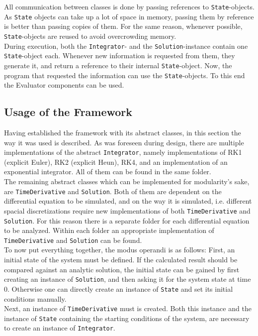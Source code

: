 All communication between classes is done by passing references to \texttt{State}-objects.
As \texttt{State} objects can take up a lot of space in memory, passing them by reference is better than passing copies of them.
For the same reason, whenever possible, \texttt{State}-objects are reused to avoid overcrowding memory.
\\
During execution, both the \texttt{Integrator}- and the \texttt{Solution}-instance contain one \texttt{State}-object each.
Whenever new information is requested from them, they generate it, and return a reference to their internal \texttt{State}-object.
Now, the program that requested the information can use the \texttt{State}-objects.
To this end the Evaluator components can be used.

\subsection{Usage of the Framework}
Having established the framework with its abstract classes, in this section the way it was used is described.
As was foreseen during design, there are multiple implementations of the abstract \texttt{Integrator}, namely implementations of RK1 (explicit Euler), RK2 (explicit Heun), RK4, and an implementation of an exponential integrator.
All of them can be found in the same folder.
\\
The remaining abstract classes which can be implemented for modularity's sake, are \texttt{TimeDerivative} and \texttt{Solution}.
Both of them are dependent on the differential equation to be simulated, and on the way it is simulated, i.e. different spacial discretizations require new implementations of both \texttt{TimeDerivative} and \texttt{Solution}.
For this reason there is a separate folder for each differential equation to be analyzed.
Within each folder an appropriate implementation of \texttt{TimeDerivative} and \texttt{Solution} can be found.
\\
To now put everything together, the modus operandi is as follows:
First, an initial state of the system must be defined.
If the calculated result should be compared against an analytic solution, the initial state can be gained by first creating an instance of \texttt{Solution}, and then asking it for the system state at time $0$.
Otherwise one can directly create an instance of \texttt{State} and set its initial conditions manually.
\\
Next, an instance of \texttt{TimeDerivative} must is created.
Both this instance and the instance of \texttt{State} containing the starting conditions of the system, are necessary to create an instance of \texttt{Integrator}.
